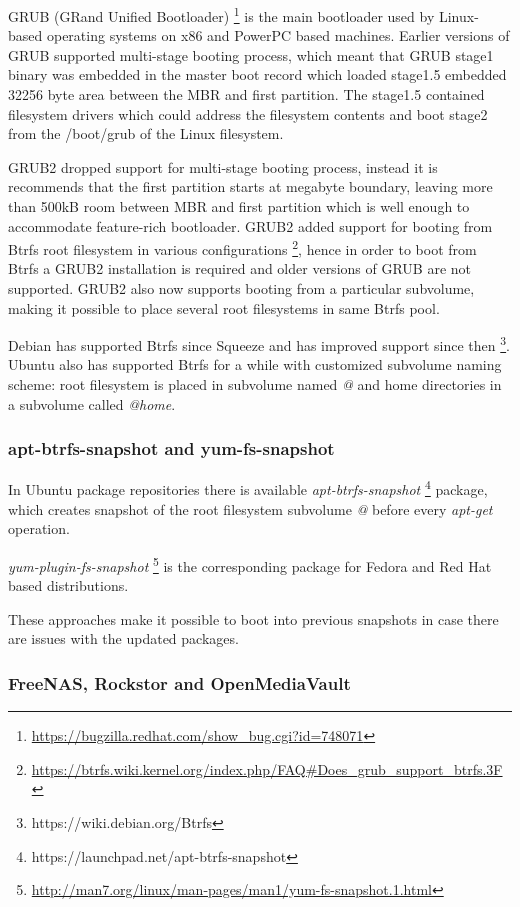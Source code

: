 \documentclass{article}
\begin{document}
GRUB (GRand Unified Bootloader)
\footnote{\url{https://bugzilla.redhat.com/show_bug.cgi?id=748071}}
is the main bootloader used
by Linux-based operating systems on x86 and PowerPC based machines.
Earlier versions of GRUB supported multi-stage booting process,
which meant that GRUB stage1 binary was embedded in the
master boot record which loaded stage1.5 embedded
32256 byte area between the MBR and first partition.
The stage1.5 contained filesystem drivers which could
address the filesystem contents and boot stage2 from
the /boot/grub of the Linux filesystem.

GRUB2 dropped support for multi-stage booting process,
instead it is recommends that the first partition
starts at megabyte boundary, leaving
more than 500kB room between MBR
and first partition which is well enough to accommodate
feature-rich bootloader.
GRUB2 added support for booting from Btrfs root filesystem
in various configurations
\footnote{\url{https://btrfs.wiki.kernel.org/index.php/FAQ#Does_grub_support_btrfs.3F}},
hence in order to boot from
Btrfs a GRUB2 installation is required and older versions of
GRUB are not supported.
GRUB2 also now supports booting from a particular subvolume,
making it possible to place several root filesystems
in same Btrfs pool.

Debian has supported Btrfs since Squeeze and has improved support
since then \footnote{https://wiki.debian.org/Btrfs}.
Ubuntu also has supported Btrfs for a while with customized
subvolume naming scheme:
root filesystem is placed in subvolume named \emph{@}
and home directories in a subvolume called \emph{@home}.

\subsubsection{apt-btrfs-snapshot and yum-fs-snapshot}

In Ubuntu package repositories there is available
\emph{apt-btrfs-snapshot}
\footnote{https://launchpad.net/apt-btrfs-snapshot}
package,
which creates snapshot of the root filesystem subvolume \emph{@}
before every \emph{apt-get} operation.

\emph{yum-plugin-fs-snapshot}
\footnote{\url{http://man7.org/linux/man-pages/man1/yum-fs-snapshot.1.html}}
is the corresponding package for Fedora and
Red Hat based distributions.

These approaches make it possible to boot into previous snapshots
in case there are issues with the updated packages.

\subsubsection{FreeNAS, Rockstor and OpenMediaVault}
\end{document}
